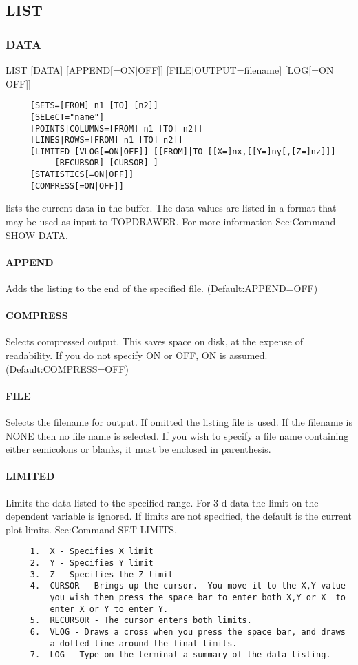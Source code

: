 \subsection{LIST}
\subsubsection{DATA}
LIST [DATA] [APPEND[=ON$|$OFF]] [FILE$|$OUTPUT=filename] [LOG[=ON$|$OFF]] 
\begin{verbatim}
     [SETS=[FROM] n1 [TO] [n2]] 
     [SELeCT="name"] 
     [POINTS|COLUMNS=[FROM] n1 [TO] n2]] 
     [LINES|ROWS=[FROM] n1 [TO] n2]] 
     [LIMITED [VLOG[=ON|OFF]] [[FROM]|TO [[X=]nx,[[Y=]ny[,[Z=]nz]]]
          [RECURSOR] [CURSOR] ] 
     [STATISTICS[=ON|OFF]] 
     [COMPRESS[=ON|OFF]] 
\end{verbatim}

lists  the current data in the buffer.  The data values are listed in a
format that may be used as input to TOPDRAWER.   For  more  information
See:Command SHOW DATA.  
\paragraph{APPEND}
Adds the listing to the end of the specified file.  
(Default:APPEND=OFF) 
\paragraph{COMPRESS}
Selects  compressed output.  This saves space on disk, at the expense
of readability.  If you do not specify ON or OFF, ON is assumed.  
(Default:COMPRESS=OFF) 
\paragraph{FILE}
Selects  the  filename  for  output.   If omitted the listing file is
used.  If the filename is NONE then no file name is selected.  If you
wish  to  specify a file name containing either semicolons or blanks,
it must be enclosed in parenthesis.  
\paragraph{LIMITED}
Limits  the  data  listed  to  the specified range.  For 3-d data the
limit on the dependent  variable  is  ignored.   If  limits  are  not
specified,    the    default    is    the    current   plot   limits.
See:Command SET LIMITS.  
\begin{verbatim}
     1.  X - Specifies X limit 
     2.  Y - Specifies Y limit 
     3.  Z - Specifies the Z limit 
     4.  CURSOR - Brings up the cursor.  You move it to the X,Y value
         you wish then press the space bar to enter both X,Y or X  to
         enter X or Y to enter Y.  
     5.  RECURSOR - The cursor enters both limits.  
     6.  VLOG - Draws a cross when you press the space bar, and draws
         a dotted line around the final limits.  
     7.  LOG - Type on the terminal a summary of the data listing.  
\end{verbatim}

